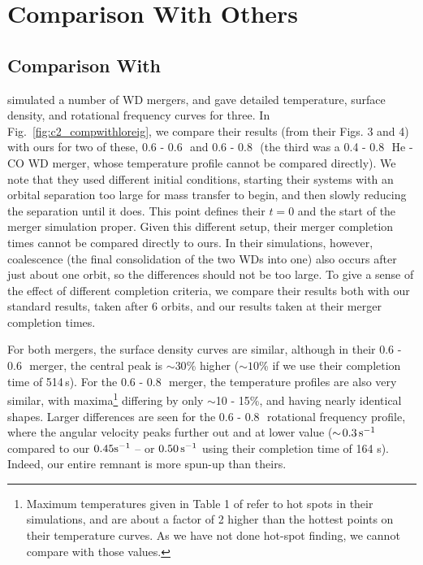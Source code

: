 

\section{Comparison With Others}
\label{sec:c2_compwithothers}


\subsection{Comparison With \cite{loreig09}}
\label{ssec:c2_compwithloreig}

\citeal{loreig09} simulated a number of WD mergers, and gave detailed temperature, surface density, and rotational frequency curves for three.   In Fig.~\ref{fig:c2_compwithloreig}, we compare their results (from their Figs. 3 and 4) with ours for two of these, 0.6 - 0.6\,\Msun\ and 0.6 - 0.8\,\Msun\ (the third was a 0.4 - 0.8\,\Msun\ He - CO WD merger, whose temperature profile cannot be compared directly).  We note that they used different initial conditions, starting their systems with an orbital separation too large for mass transfer to begin, and then slowly reducing the separation until it does.  This point defines their $t = 0$ and the start of the merger simulation proper.  Given this different setup, their merger completion times cannot be compared directly to ours.  In their simulations, however, coalescence (the final consolidation of the two WDs into one) also occurs after just about one orbit, so the differences should not be too large.  To give a sense of the effect of different completion criteria, we compare their results both with our standard results, taken after 6 orbits, and our results taken at their merger completion times.

For both mergers, the surface density curves are similar, although in their 0.6 - 0.6\,\Msun\ merger, the central peak is $\sim\!30$\% higher ($\sim\!10$\% if we use their completion time of 514\,s).  For the 0.6 - 0.8\,\Msun\ merger, the temperature profiles are also very similar, with maxima\footnote{Maximum temperatures given in Table 1 of \citeal{loreig09} refer to hot spots in their simulations, and are about a factor of 2 higher than the hottest points on their temperature curves.  As we have not done hot-spot finding, we cannot compare with those values.} differing by only $\sim$10 - 15\%, and having nearly identical shapes.  Larger differences are seen for the 0.6 - 0.8\,\Msun\ rotational frequency profile, where the angular velocity peaks further out and at lower value ($\sim\!0.3\,\psec$ compared to our $0.45\psec$ -- or $0.50\,\psec$ using their completion time of 164 s).  Indeed, our entire remnant is more spun-up than theirs.  

